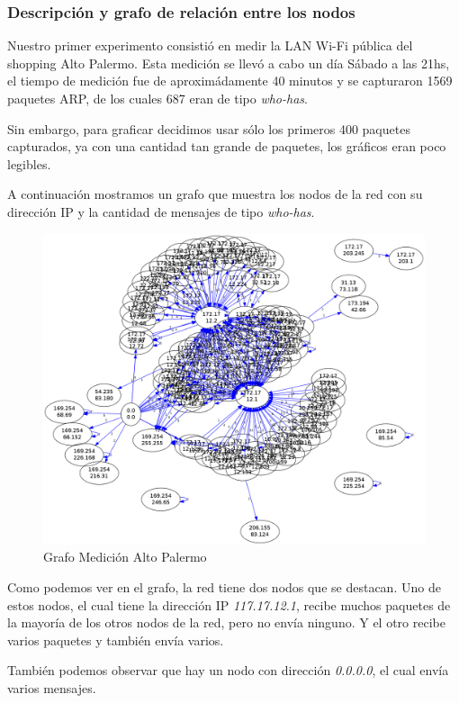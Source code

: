 \subsubsection{Descripción y grafo de relación entre los nodos}

Nuestro primer experimento consistió en medir la LAN Wi-Fi pública del shopping Alto Palermo. Esta medición se llevó a cabo un día Sábado a las 21hs, el tiempo de medición fue de aproximádamente 40 minutos y se capturaron 1569 paquetes ARP, de los cuales 687 eran de tipo \emph{who-has}.

Sin embargo, para graficar decidimos usar sólo los primeros 400 paquetes capturados, ya con una cantidad tan grande de paquetes, los gráficos eran poco legibles.

A continuación mostramos un grafo que muestra los nodos de la red con su dirección IP y la cantidad de mensajes de tipo \emph{who-has}.

\begin{figure}[H]
 \begin{center}
  \includegraphics[width=0.9\linewidth]{../imgs/red-alto-palermo_red.png}
  \caption{Grafo Medición Alto Palermo}
 \end{center}
\end{figure}

Como podemos ver en el grafo, la red tiene dos nodos que se destacan. Uno de estos nodos, el cual tiene la dirección IP \emph{117.17.12.1}, recibe muchos paquetes de la mayoría de los otros nodos de la red, pero no envía ninguno. Y el otro recibe varios paquetes y también envía varios.

También podemos observar que hay un nodo con dirección \emph{0.0.0.0}, el cual envía varios mensajes. %

